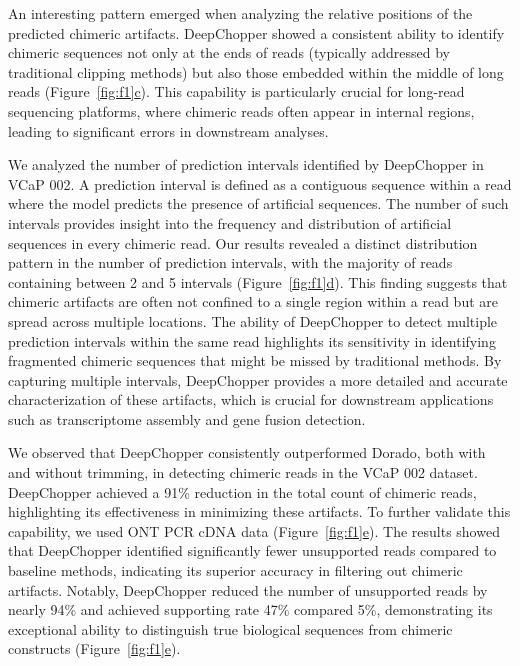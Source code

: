 \documentclass[pdflatex, sn-mathphys-num, lineno]{sn-jnl}%
\newcommand{\chopper}{DeepChopper\xspace}
\newcommand{\figref}[2]{Figure~\hyperref[#1]{\ref*{#1}#2}}
\theoremstyle{thmstyleone}%
\theoremstyle{thmstyletwo}%
\theoremstyle{thmstylethree}%
\begin{document}

An interesting pattern emerged when analyzing the relative positions of the predicted chimeric artifacts.
\chopper showed a consistent ability to identify chimeric sequences not only at the ends of reads (typically addressed by traditional clipping methods) but also those embedded within the middle of long reads (\figref{fig:f1}{c}).
This capability is particularly crucial for long-read sequencing platforms, where chimeric reads often appear in internal regions, leading to significant errors in downstream analyses.


We analyzed the number of prediction intervals identified by \chopper in VCaP 002.
A prediction interval is defined as a contiguous sequence within a read where the model predicts the presence of artificial sequences.
The number of such intervals provides insight into the frequency and distribution of artificial sequences in every chimeric read.
Our results revealed a distinct distribution pattern in the number of prediction intervals, with the majority of reads containing between 2 and 5 intervals (\figref{fig:f1}{d}).
This finding suggests that chimeric artifacts are often not confined to a single region within a read but are spread across multiple locations.
The ability of \chopper to detect multiple prediction intervals within the same read highlights its sensitivity in identifying fragmented chimeric sequences that might be missed by traditional methods.
By capturing multiple intervals, \chopper provides a more detailed and accurate characterization of these artifacts, which is crucial for downstream applications such as transcriptome assembly and gene fusion detection.


We observed that \chopper consistently outperformed Dorado, both with and without trimming, in detecting chimeric reads in the VCaP 002 dataset.
\chopper achieved a 91\% reduction in the total count of chimeric reads, highlighting its effectiveness in minimizing these artifacts.
To further validate this capability, we used ONT PCR cDNA data (\figref{fig:f1}{e}).
The results showed that \chopper identified significantly fewer unsupported reads compared to baseline methods, indicating its superior accuracy in filtering out chimeric artifacts.
Notably, \chopper reduced the number of unsupported reads by nearly 94\% and achieved  supporting rate 47\% compared 5\%, demonstrating its exceptional ability to distinguish true biological sequences from chimeric constructs (\figref{fig:f1}{e}).
\end{document}
